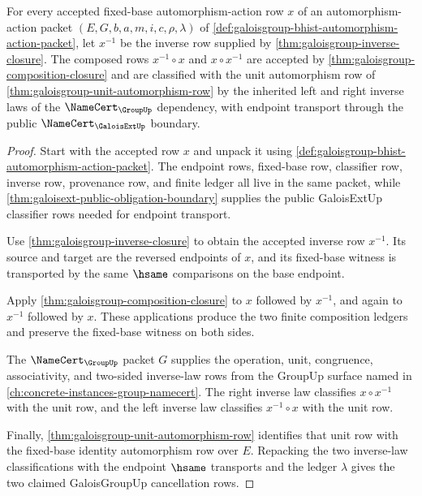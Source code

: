 \begin{theorem}
\label{thm:galoisgroup-inverse-cancellation-rows}
For every accepted fixed-base automorphism-action row $x$ of an
automorphism-action packet
$(E,G,b,a,m,i,c,\rho,\lambda)$ of
\autoref{def:galoisgroup-bhist-automorphism-action-packet}, let $x^{-1}$ be the
inverse row supplied by \autoref{thm:galoisgroup-inverse-closure}. The composed
rows $x^{-1}\circ x$ and $x\circ x^{-1}$ are accepted by
\autoref{thm:galoisgroup-composition-closure} and are classified with the unit
automorphism row of \autoref{thm:galoisgroup-unit-automorphism-row} by the
inherited left and right inverse laws of the $\NameCert_{\GroupUp}$ dependency,
with endpoint transport through the public $\NameCert_{\GaloisExtUp}$ boundary.
\end{theorem}
\begin{proof}
Start with the accepted row $x$ and unpack it using
\autoref{def:galoisgroup-bhist-automorphism-action-packet}. The endpoint rows,
fixed-base row, classifier row, inverse row, provenance row, and finite ledger
all live in the same packet, while
\autoref{thm:galoisext-public-obligation-boundary} supplies the public
GaloisExtUp classifier rows needed for endpoint transport.

Use \autoref{thm:galoisgroup-inverse-closure} to obtain the accepted inverse
row $x^{-1}$. Its source and target are the reversed endpoints of $x$, and its
fixed-base witness is transported by the same $\hsame$ comparisons on the base
endpoint.

Apply \autoref{thm:galoisgroup-composition-closure} to $x$ followed by
$x^{-1}$, and again to $x^{-1}$ followed by $x$. These applications produce the
two finite composition ledgers and preserve the fixed-base witness on both
sides.

The $\NameCert_{\GroupUp}$ packet $G$ supplies the operation, unit, congruence,
associativity, and two-sided inverse-law rows from the GroupUp surface named in
\autoref{ch:concrete-instances-group-namecert}. The right inverse law classifies
$x\circ x^{-1}$ with the unit row, and the left inverse law classifies
$x^{-1}\circ x$ with the unit row.

Finally, \autoref{thm:galoisgroup-unit-automorphism-row} identifies that unit
row with the fixed-base identity automorphism row over $E$. Repacking the two
inverse-law classifications with the endpoint $\hsame$ transports and the
ledger $\lambda$ gives the two claimed GaloisGroupUp cancellation rows.
\end{proof}


